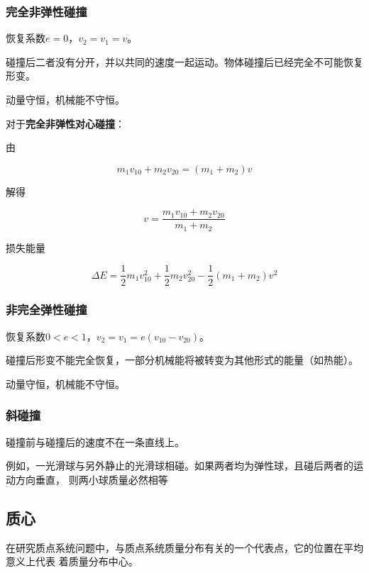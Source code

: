 \documentclass[
	12pt, %
	a4paper, %
]{myLegrandOrangeBook}
\begin{document}
    \subsubsection*{完全非弹性碰撞}

    恢复系数\(e=0\)，\(v_2=v_1=v\)。

    碰撞后二者没有分开，并以共同的速度一起运动。物体碰撞后已经完全不可能恢复形变。

    动量守恒，机械能不守恒。

    对于\textbf{完全非弹性对心碰撞}：

    由

    $$
        m_1 v_{10}+m_2 v_{20}=\left(m_1+m_2\right) v
    $$

    解得

    \begin{equation}
        v=\frac{m_1 v_{10}+m_2 v_{20}}{m_1+m_2}
    \end{equation}

    损失能量

    \begin{equation}
        \Delta E=\frac{1}{2} m_1 v_{10}^2+\frac{1}{2} m_2 v_{20}^2-\frac{1}{2}\left(m_1+m_2\right) v^2
    \end{equation}

    \subsubsection*{非完全弹性碰撞}

    恢复系数\(0<e<1\)，\(v_2=v_1=e\left(v_{10} - v_{20}\right)\)。

    碰撞后形变不能完全恢复，一部分机械能将被转变为其他形式的能量（如热能）。

    动量守恒，机械能不守恒。

    \subsubsection*{斜碰撞}

    碰撞前与碰撞后的速度不在一条直线上。

    例如，一光滑球与另外静止的光滑球相碰。如果两者均为弹性球，且碰后两者的运动方向垂直，
    则两小球质量必然相等

    \subsection{质心}

    \begin{definition}[质心]

        在研究质点系统问题中，与质点系统质量分布有关的一个代表点，它的位置在平均意义上代表
        着质量分布中心。

    \end{definition}
\end{document}
